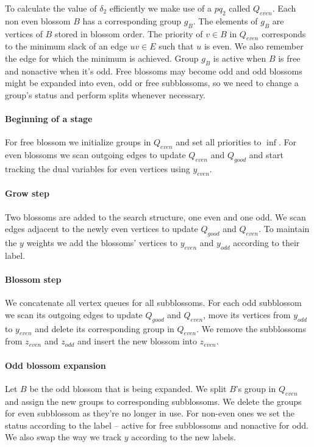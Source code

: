 To calculate the value of $\delta_2$ efficiently we make use of a $pq_2$ called $Q_{even}$. Each non even blossom $B$ has a corresponding group $g_B$. The elements of $g_B$ are vertices of $B$ stored in blossom order. The priority of $v \in B$ in $Q_{even}$ corresponds to the minimum slack of an edge $uv \in E$ such that $u$ is even. We also remember the edge for which the minimum is achieved. Group $g_B$ is active when $B$ is free and nonactive when it's odd. Free blossoms may become odd and odd blossoms might be expanded into even, odd or free subblossoms, so we need to change a group's status and perform splits whenever necessary.

\paragraph*{Beginning of a stage} For free blossom we initialize groups in $Q_{even}$ and set all priorities to $\inf$. For even blossoms we  scan outgoing edges to update $Q_{even}$ and $Q_{good}$ and start tracking the dual variables for even vertices using $y_{even}$.

\paragraph*{Grow step} Two blossoms are added to the search structure, one even and one odd. We scan edges adjacent to the newly even vertices to update $Q_{good}$ and $Q_{even}$. To maintain the $y$ weights we add the blossoms' vertices to $y_{even}$ and $y_{odd}$ according to their label.

\paragraph*{Blossom step} We concatenate all vertex queues for all subblossoms. For each odd subblossom we scan its outgoing edges to update $Q_{good}$ and $Q_{even}$, move its vertices from $y_{odd}$ to $y_{even}$ and delete its corresponding group in $Q_{even}$. We remove the subblossoms from $z_{even}$ and $z_{odd}$ and insert the new blossom into $z_{even}$.

\paragraph*{Odd blossom expansion} Let $B$ be the odd blossom that is being expanded. We split $B$'s group in $Q_{even}$ and assign the new groups to corresponding subblossoms. We delete the groups for even subblossom as they're no longer in use. For non-even ones we set the status according to the label – active for free subblossoms and nonactive for odd. We also swap the way we track $y$ according to the new labels.

